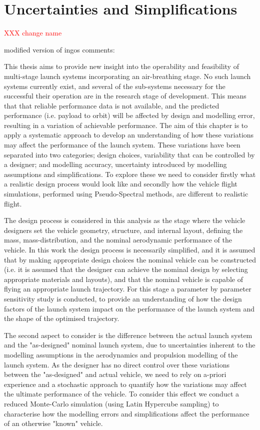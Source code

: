 \chapter{Uncertainties and Simplifications}

\textcolor{red}{XXX change name}

modified version of ingos comments:

This thesis aims to provide new insight into the operability and feasibility of multi-stage launch systems incorporating an air-breathing stage.
No such launch systems currently exist, and several of the sub-systems necessary for the successful their operation are in the research stage of development.
This means that that reliable performance data is not available, and the predicted performance (i.e. payload to orbit) will be affected by design and modelling error, resulting in a variation of achievable performance. 
The aim of this chapter is to apply a systematic approach to develop an understanding of how these variations may affect the performance of the launch system. These variations have been separated into two categories; design choices, variability that can be controlled by a designer; and modelling accuracy, uncertainty introduced by modelling assumptions and simplifications. To explore these we need to consider firstly what a realistic design process would look like and secondly how the vehicle flight simulations, performed using Pseudo-Spectral methods, are different to realistic flight. 



The design process is considered in this analysis as the stage where the vehicle designers set the vehicle geometry, structure, and internal layout, defining the mass, mass-distribution, and the nominal aerodynamic performance of the vehicle. In this work the design process is necessarily simplified, and it is assumed that by making appropriate design choices the nominal vehicle can be constructed (i.e. it is assumed that the designer can achieve the nominal design by selecting appropriate materials and layouts), and that the nominal vehicle is capable of flying an appropriate launch trajectory. For this stage a parameter by parameter sensitivity study is conducted, to provide an understanding of how the design factors of the launch system impact on the performance of the launch system and the shape of the optimised trajectory. 



The second aspect to consider is the difference between the actual launch system and the "as-designed" nominal launch system, due to uncertainties inherent to the modelling assumptions in the aerodynamics and propulsion modelling of the launch system. As the designer has no direct control over these variations between the "as-designed" and actual vehicle, we need to rely on a-priori experience and a stochastic approach to quantify how the variations may affect the ultimate performance of the vehicle. To consider this effect we conduct a reduced Monte-Carlo simulation (using Latin Hypercube sampling) to characterise how the modelling errors and simplifications affect the performance of an otherwise "known" vehicle. 


